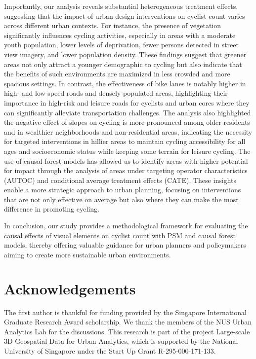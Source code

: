 \documentclass[preprint,12pt, authoryear]{elsarticle}
\begin{document}
Importantly, our analysis reveals substantial heterogeneous treatment effects, suggesting that the impact of urban design interventions on cyclist count varies across different urban contexts. For instance, the presence of vegetation significantly influences cycling activities, especially in areas with a moderate youth population, lower levels of deprivation, fewer persons detected in street view imagery, and lower population density. These findings suggest that greener areas not only attract a younger demographic to cycling but also indicate that the benefits of such environments are maximized in less crowded and more spacious settings. In contrast, the effectiveness of bike lanes is notably higher in high- and low-speed roads and densely populated areas, highlighting their importance in high-risk and leisure roads for cyclists and urban cores where they can significantly alleviate transportation challenges.
The analysis also highlighted the negative effect of slopes on cycling is more pronounced among older residents and in wealthier neighborhoods and non-residential areas, indicating the necessity for targeted interventions in hillier areas to maintain cycling accessibility for all ages and socioeconomic status while keeping some terrain for leisure cycling.
The use of causal forest models has allowed us to identify areas with higher potential for impact through the analysis of areas under targeting operator characteristics (AUTOC) and conditional average treatment effects (CATE). These insights enable a more strategic approach to urban planning, focusing on interventions that are not only effective on average but also where they can make the most difference in promoting cycling.

In conclusion, our study provides a methodological framework for evaluating the causal effects of visual elements on cyclist count with PSM and causal forest models, thereby offering valuable guidance for urban planners and policymakers aiming to create more sustainable urban environments.

\section*{Acknowledgements}
The first author is thankful for funding provided by the Singapore International Graduate Research Award scholarship.
We thank the members of the NUS Urban Analytics Lab for the discussions.
This research is part of the project Large-scale 3D Geospatial Data for Urban Analytics, which is supported by the National University of Singapore under the Start Up Grant R-295-000-171-133.
\end{document}

